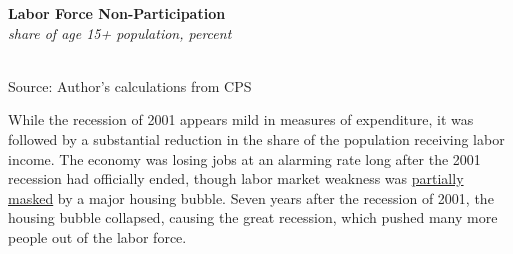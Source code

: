 \documentclass{report}
\newcommand{\barylab}[2]{yticklabel style={text width=#1, align=right, 
		style={black!70}, text height=#2},}
\newcommand{\bbar}[2]{extra #1 ticks = {{#2}}, extra #1 tick labels = ,
		extra #1 tick style = {grid=major, grid style={thick, black!25}},}
\newcommand{\barplotnogrid}{xbar=0pt, axis line style={draw=none},
	    yticklabel style={align=left, anchor=east},
      		xmajorticks=false, ymajorgrids=false,   
	    ytick=data, tickwidth=0pt, area legend, reverse legend,
	    nodes near coords, nodes near coords align={horizontal},}
\begin{document}
{{\begin{minipage}{0.38\textwidth}
\normalsize \textbf{Labor Force Non-Participation}\\
\footnotesize{\textit{share of age 15+ population, percent}}\\
\hspace*{-4mm} \\
\footnotesize{Source: Author's calculations from CPS}
\end{minipage} \hspace{4mm}
\begin{minipage}{0.34\textwidth}
\small 
\end{minipage}

\begin{minipage}{0.76\textwidth}
\small While the recession of 2001 appears mild in measures of expenditure, it was followed by a substantial reduction in the share of the population receiving labor income. The economy was losing jobs at an alarming rate long after the 2001 recession had officially ended, though labor market weakness was \href{https://www.aeaweb.org/articles?id=10.1257/jep.30.2.179}{partially masked} by a major housing bubble. Seven years after the recession of 2001, the housing bubble collapsed, causing the great recession, which pushed many more people out of the labor force.
\end{minipage}

}}
\end{document}
